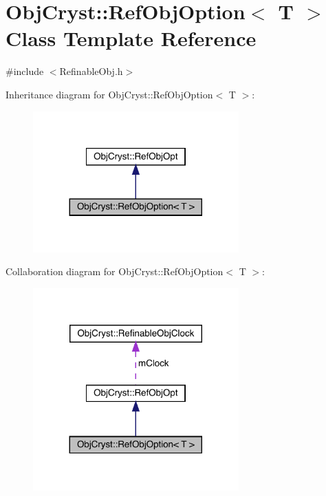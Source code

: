 \hypertarget{class_obj_cryst_1_1_ref_obj_option}{}\section{Obj\+Cryst\+::Ref\+Obj\+Option$<$ T $>$ Class Template Reference}
\label{class_obj_cryst_1_1_ref_obj_option}


{\ttfamily \#include $<$Refinable\+Obj.\+h$>$}



Inheritance diagram for Obj\+Cryst\+::Ref\+Obj\+Option$<$ T $>$\+:
\nopagebreak
\begin{figure}[H]
\begin{center}
\leavevmode
\includegraphics[width=224pt]{class_obj_cryst_1_1_ref_obj_option__inherit__graph}
\end{center}
\end{figure}


Collaboration diagram for Obj\+Cryst\+::Ref\+Obj\+Option$<$ T $>$\+:
\nopagebreak
\begin{figure}[H]
\begin{center}
\leavevmode
\includegraphics[width=224pt]{class_obj_cryst_1_1_ref_obj_option__coll__graph}
\end{center}
\end{figure}
